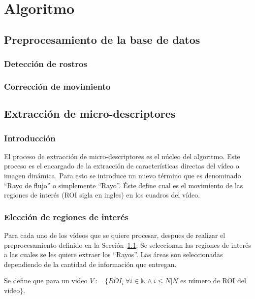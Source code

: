 \chapter[Algoritmo]{Algoritmo}
\label{ch:algoritmo}

\section{Preprocesamiento de la base de datos}
\label{sec:proc_bdd}
	\subsection{Detección de rostros}
	\label{algoritmo:det_rostro}
	
	\subsection{Corrección de movimiento}
	\label{algoritmo:cor_movimiento}

\section{Extracción de micro-descriptores}
\label{sec:micro-descriptores}
	\subsection{Introducción}
	\label{algoritmo:extr_intro}
		El proceso de extracción de micro-descriptores es el núcleo del algoritmo. Este proceso es el encargado de la extracción de características directas del vídeo o imagen dinámica. Para esto se introduce un nuevo término que es denominado ``Rayo de flujo'' o simplemente ``Rayo''. Éste define cual es el movimiento de las regiones de interés (ROI sigla en ingles) en los cuadros del vídeo.

	\subsection{Elección de regiones de interés}
	\label{algoritmo:elecc_roi}
	Para cada uno de los vídeos que se quiere procesar, despues de realizar el preprocesamiento definido en la Sección~\ref{sec:proc_bdd}. Se seleccionan las regiones de interés a las cuales se les quiere extraer los ``Rayos''. Las áreas son seleccionadas dependiendo de la cantidad de información que entregan. 
	
	Se define que para un video $V := \{ROI_i~\forall i \in \mathds{N} \land i \le N | N$ es número de ROI del video$\}$. 
	
